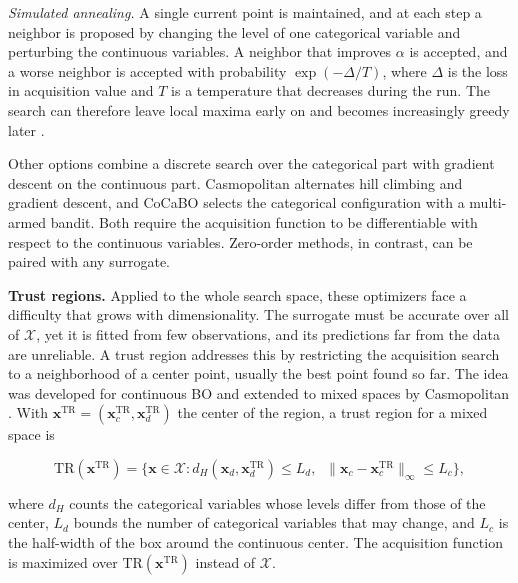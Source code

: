 \textit{Simulated annealing.} A single current point is maintained, and at each step a neighbor is proposed by changing the level of one categorical variable and perturbing the continuous variables. A neighbor that improves $\alpha$ is accepted, and a worse neighbor is accepted with probability $\exp(-\Delta / T)$, where $\Delta$ is the loss in acquisition value and $T$ is a temperature that decreases during the run. The search can therefore leave local maxima early on and becomes increasingly greedy later \citep{doi:10.1126/science.220.4598.671, pmlr-v80-baptista18a}.

Other options combine a discrete search over the categorical part with gradient descent on the continuous part. Casmopolitan \citep{pmlr-v139-wan21b} alternates hill climbing and gradient descent, and CoCaBO \citep{pmlr-v119-ru20a} selects the categorical configuration with a multi-armed bandit. Both require the acquisition function to be differentiable with respect to the continuous variables. Zero-order methods, in contrast, can be paired with any surrogate.

\textbf{Trust regions.} Applied to the whole search space, these optimizers face a difficulty that grows with dimensionality. The surrogate must be accurate over all of $\mathcal{X}$, yet it is fitted from few observations, and its predictions far from the data are unreliable. A trust region addresses this by restricting the acquisition search to a neighborhood of a center point, usually the best point found so far. The idea was developed for continuous BO \citep{eriksson2019scalable} and extended to mixed spaces by Casmopolitan \citep{pmlr-v139-wan21b}. With $\boldsymbol{x}^{\mathrm{TR}} = (\boldsymbol{x}_c^{\mathrm{TR}}, \boldsymbol{x}_d^{\mathrm{TR}})$ the center of the region, a trust region for a mixed space is

\begin{equation}
  \mathrm{TR}(\boldsymbol{x}^{\mathrm{TR}}) = \big\{ \boldsymbol{x} \in \mathcal{X} : d_H(\boldsymbol{x}_d, \boldsymbol{x}_d^{\mathrm{TR}}) \le L_d, \;\; \lVert \boldsymbol{x}_c - \boldsymbol{x}_c^{\mathrm{TR}} \rVert_\infty \le L_c \big\},
  \label{eq:trust-region}
\end{equation}

where $d_H$ counts the categorical variables whose levels differ from those of the center, $L_d$ bounds the number of categorical variables that may change, and $L_c$ is the half-width of the box around the continuous center. The acquisition function is maximized over $\mathrm{TR}(\boldsymbol{x}^{\mathrm{TR}})$ instead of $\mathcal{X}$. %

